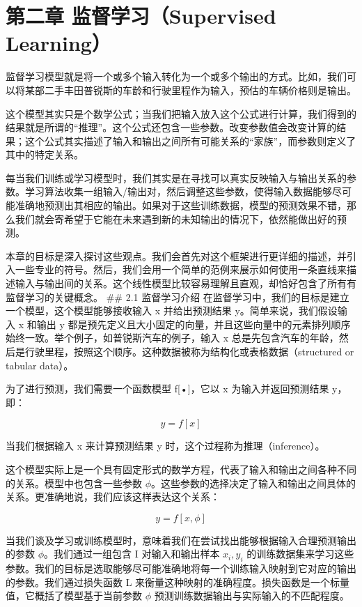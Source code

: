 \documentclass[
]{article}
\author{}
\date{}
\begin{document}
\hypertarget{ux7b2cux4e8cux7ae0-ux76d1ux7763ux5b66ux4e60supervised-learning}{%
\section{第二章 监督学习（Supervised
Learning）}\label{ux7b2cux4e8cux7ae0-ux76d1ux7763ux5b66ux4e60supervised-learning}}

监督学习模型就是将一个或多个输入转化为一个或多个输出的方式。比如，我们可以将某部二手丰田普锐斯的车龄和行驶里程作为输入，预估的车辆价格则是输出。

这个模型其实只是个数学公式；当我们把输入放入这个公式进行计算，我们得到的结果就是所谓的``推理''。这个公式还包含一些参数。改变参数值会改变计算的结果；这个公式其实描述了输入和输出之间所有可能关系的``家族''，而参数则定义了其中的特定关系。

每当我们训练或学习模型时，我们其实是在寻找可以真实反映输入与输出关系的参数。学习算法收集一组输入/输出对，然后调整这些参数，使得输入数据能够尽可能准确地预测出其相应的输出。如果对于这些训练数据，模型的预测效果不错，那么我们就会寄希望于它能在未来遇到新的未知输出的情况下，依然能做出好的预测。

本章的目标是深入探讨这些观点。我们会首先对这个框架进行更详细的描述，并引入一些专业的符号。然后，我们会用一个简单的范例来展示如何使用一条直线来描述输入与输出间的关系。这个线性模型比较容易理解且直观，却恰好包含了所有有监督学习的关键概念。
\#\# 2.1 监督学习介绍
在监督学习中，我们的目标是建立一个模型，这个模型能够接收输入 x
并给出预测结果 y。简单来说，我们假设输入 x 和输出 y
都是预先定义且大小固定的向量，并且这些向量中的元素排列顺序始终一致。举个例子，如普锐斯汽车的例子，输入
x
总是先包含汽车的年龄，然后是行驶里程，按照这个顺序。这种数据被称为结构化或表格数据（structured
or tabular data）。

为了进行预测，我们需要一个函数模型 f{[}•{]}，它以 x 为输入并返回预测结果
y，即：

\[
y = f[x] \tag{2.1}
\]

当我们根据输入 x 来计算预测结果 y 时，这个过程称为推理（inference）。

这个模型实际上是一个具有固定形式的数学方程，代表了输入和输出之间各种不同的关系。模型中也包含一些参数
\(\phi\)。这些参数的选择决定了输入和输出之间具体的关系。更准确地说，我们应该这样表达这个关系：

\[
y = f[x, \phi] \tag{2.2}
\]

当我们谈及学习或训练模型时，意味着我们在尝试找出能够根据输入合理预测输出的参数
\(\phi\)。我们通过一组包含 I 对输入和输出样本 \({x_i, y_i}\)
的训练数据集来学习这些参数。我们的目标是选取能够尽可能准确地将每一个训练输入映射到它对应的输出的参数。我们通过损失函数
L
来衡量这种映射的准确程度。损失函数是一个标量值，它概括了模型基于当前参数
\(\phi\) 预测训练数据输出与实际输入的不匹配程度。
\end{document}
